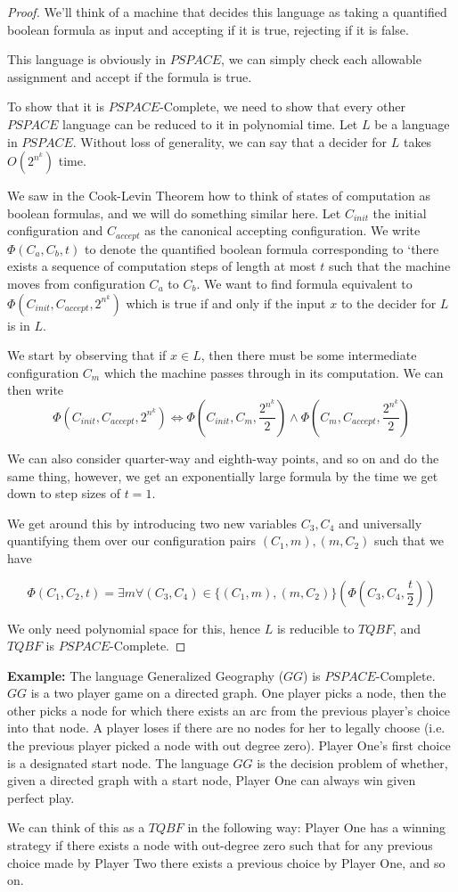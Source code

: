 \begin{proof}
	
	We'll think of a machine that decides this language as taking a quantified boolean formula as input and accepting if it is true, rejecting if it is false.
	
	This language is obviously in $PSPACE$, we can simply check each allowable assignment and accept if the formula is true.
	
	To show that it is $PSPACE$-Complete, we need to show that every other $PSPACE$ language can be reduced to it in polynomial time.  Let $L$ be a language in $PSPACE$.  Without loss of generality, we can say that a decider for $L$ takes $O(2^{n^k})$ time. 
	
	We saw in the Cook-Levin Theorem how to think of states of computation as boolean formulas, and we will do something similar here.  Let $C_{init}$ the initial configuration and $C_{accept}$ as the canonical accepting configuration.  We write $\Phi(C_a,C_b,t)$ to denote the quantified boolean formula corresponding to `there exists a sequence of computation steps of length at most $t$ such that the machine moves from configuration $C_a$ to $C_b$.  We want to find formula equivalent to $\Phi(C_{init},C_{accept},2^{n^k})$ which is true if and only if the input $x$ to the decider for $L$ is in $L$.
	
	We start by observing that if $x\in L$, then there must be some intermediate configuration $C_m$ which the machine passes through in its computation.  We can then write \[\Phi(C_{init},C_{accept},2^{n^k}) \iff \Phi(C_{init},C_{m},\frac{2^{n^k}}{2})\land \Phi(C_{m},C_{accept},\frac{2^{n^k}}{2})\]
	
	We can also consider quarter-way and eighth-way points, and so on and do the same thing, however, we get an exponentially large formula by the time we get down to step sizes of $t=1$.
	
	We get around this by introducing two new variables $C_3,C_4$ and universally quantifying them over our configuration pairs $(C_1,m),(m,C_2)$ such that we have 

	\[ \Phi(C_1,C_2,t)=\exists m \forall(C_3,C_4)\in \{ (C_1,m),(m,C_2) \} (\Phi(C_3,C_4,\frac{t}{2})) \]
	
	We only need polynomial space for this, hence $L$ is reducible to $TQBF$, and $TQBF$ is $PSPACE$-Complete.
\end{proof}



\textbf{Example:} The language Generalized Geography ($GG$) is $PSPACE$-Complete.  $GG$ is a two player game on a directed graph.  One player picks a node, then the other picks a node for which there exists an arc from the previous player's choice into that node.  A player loses if there are no nodes for her to legally choose (i.e. the previous player picked a node with out degree zero).  Player One's first choice is a designated start node.  The language $GG$ is the decision problem of whether, given a directed graph with a start node, Player One can always win given perfect play.

We can think of this as a $TQBF$ in the following way:  Player One has a winning strategy if there exists a node with out-degree zero such that for any previous choice made by Player Two there exists a previous choice by Player One, and so on.


